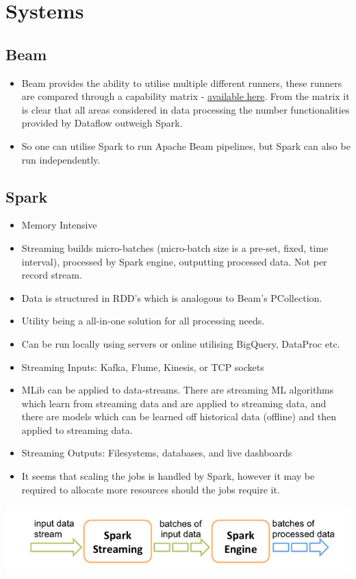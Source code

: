 \documentclass[english]{article}
\begin{document}
\section{Systems}
\subsection{Beam}
\begin{itemize}
\item Beam provides the ability to utilise multiple different runners, these runners are compared through a capability matrix - \href{https://beam.apache.org/documentation/runners/capability-matrix/}{available here}. From the matrix it is clear that all areas considered in data processing the number functionalities provided by Dataflow outweigh Spark.
\item So one can utilise Spark to run Apache Beam pipelines, but Spark can also be run independently.
\end{itemize}
\subsection{Spark}
\begin{itemize}
\item Memory Intensive
\item Streaming builds micro-batches (micro-batch size is a pre-set, fixed, time interval), processed by Spark engine, outputting processed data. Not per record stream.
\item Data is structured in RDD's which is analogous to Beam's PCollection.
\item Utility being a all-in-one solution for all processing needs.
\item Can be run locally using servers or online utilising BigQuery, DataProc etc.
\item Streaming Inputs: Kafka, Flume, Kinesis, or TCP sockets
\item MLib can be applied to data-streams. There are streaming ML algorithms which learn from streaming data and are applied to streaming data, and there are models which can be learned off historical data (offline) and then applied to streaming data.
\item Streaming Outputs: Filesystems, databases, and live dashboards
\item It seems that scaling the jobs is handled by Spark, however it may be required to allocate more resources should the jobs require it.
\end{itemize}
\includegraphics[scale=0.5]{spark_streaming_model.png}
\\\\
\end{document}
